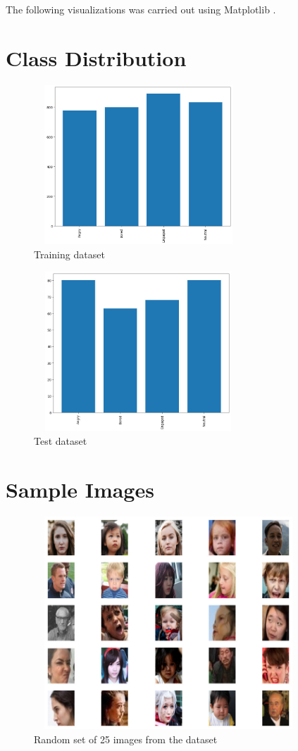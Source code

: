 The following visualizations was carried out using Matplotlib \cite{Matplotlib}.

\section{Class Distribution}
\begin{figure}[h!]
    \centering
    \includegraphics[width=0.7\textwidth, height=6cm]{resources/bg-train.jpeg}
    \caption{Training dataset}
  \end{figure}

  \begin{figure}[h!]
    \centering
    \includegraphics[width=0.7\textwidth, height=6cm]{resources/bg-test.jpeg}
    \caption{Test dataset}
  \end{figure}

\section{Sample Images}

\begin{figure}[h!]
    \centering
    \includegraphics[width=0.9\textwidth, height=8cm]{resources/random25.jpeg}
    \caption{Random set of 25 images from the dataset}
  \end{figure}


